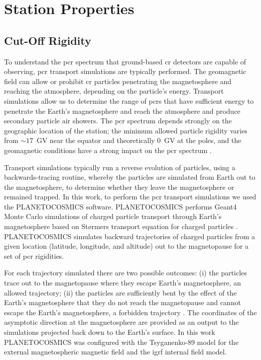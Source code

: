 \section{Station Properties}\label{sec:HS_properties}

\subsection{Cut-Off Rigidity}

To understand the \gls{pcr} spectrum that ground-based \gls{cr} detectors are capable of observing, \gls{pcr} transport simulations are typically performed. The geomagnetic field can allow or prohibit \gls{cr} particles penetrating the magnetosphere and reaching the atmosphere, depending on the particle's energy. Transport simulations allow us to determine the range of \glspl{pcr} that have sufficient energy to penetrate the Earth's magnetosphere and reach the atmosphere and produce secondary particle air showers. The \gls{pcr} spectrum depends strongly on the geographic location of the station; the minimum allowed particle rigidity varies from $\sim 17$~GV near the equator and theoretically 0~GV at the poles, and the geomagnetic conditions have a strong impact on the \gls{pcr} spectrum \citep{shea_study_1965, desorgher_planetocosmics_2005, desorgher_planetocosmics_2006, danilova_mapping_2019}. 

Transport simulations typically run a reverse evolution of particles, using a backwards-tracing routine, whereby the particles are simulated from Earth out to the magnetosphere, to determine whether they leave the magnetosphere or remained trapped. In this work, to perform the \gls{pcr} transport simulations we used the PLANETOCOSMICS software. PLANETOCOSMICS performs Geant4 Monte Carlo simulations of charged particle transport through Earth's magnetosphere based on St\o rmers transport equation for charged particles \citep{desorgher_planetocosmics_2005, desorgher_planetocosmics_2006}. PLANETOCOSMICS simulates backward trajectories of charged particles from a given location (latitude, longitude, and altitude) out to the magnetopause for a set of \gls{pcr} rigidities. 

For each trajectory simulated there are two possible outcomes: (i) the particles trace out to the magnetopause where they escape Earth's magnetosphere, an allowed trajectory; (ii) the particles are sufficiently bent by the effect of the Earth's magnetosphere that they do not reach the magnetopause and cannot escape the Earth's magnetosphere, a forbidden trajectory \citep{desorgher_planetocosmics_2005, desorgher_planetocosmics_2006}. The coordinates of the asymptotic direction at the magnetosphere are provided as an output to the simulations projected back down to the Earth's surface. In this work PLANETOCOSMICS was configured with the Tsyganenko-89 model for the external magnetospheric magnetic field and the \gls{igrf} internal field model.

